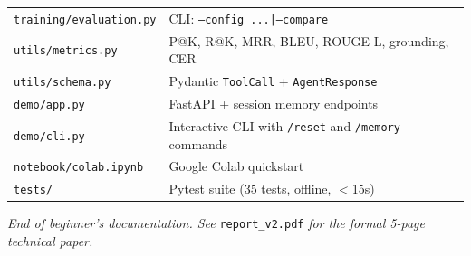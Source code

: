 \documentclass[11pt,a4paper]{article}
\begin{document}
\begin{center}
\begin{tabular}{@{}lp{9.5cm}@{}}
\texttt{training/evaluation.py}     & CLI: \texttt{--config ...|--compare} \\
\texttt{utils/metrics.py}           & P@K, R@K, MRR, BLEU, ROUGE-L, grounding, CER \\
\texttt{utils/schema.py}            & Pydantic \texttt{ToolCall} + \texttt{AgentResponse} \\
\texttt{demo/app.py}                & FastAPI + session memory endpoints \\
\texttt{demo/cli.py}                & Interactive CLI with \texttt{/reset} and \texttt{/memory} commands \\
\texttt{notebook/colab.ipynb}       & Google Colab quickstart \\
\texttt{tests/}                     & Pytest suite (35 tests, offline, $<$15s) \\
\bottomrule
\end{tabular}
\end{center}

\vspace{16pt}

\begin{center}
\textit{End of beginner's documentation. See} \texttt{report\_v2.pdf} \textit{for the formal 5-page technical paper.}
\end{center}
\end{document}
